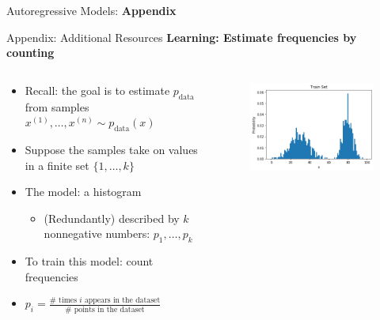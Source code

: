 \begin{frame}[allowframebreaks]{}
    \centering
    \LARGE Autoregressive Models: \textbf{Appendix}
\end{frame}

\begin{frame}[allowframebreaks]{Appendix: Additional Resources}
\large
\textbf{Learning: Estimate frequencies by counting}
\normalsize
\begin{columns}
    \begin{column}{0.55\textwidth}
       \begin{itemize}
            \setlength{\itemsep}{0.75em}
            \item Recall: the goal is to estimate $p_{\text{data}}$ from samples $x^{(1)}, \ldots, x^{(n)} \sim p_{\text{data}}(x)$
            \item Suppose the samples take on values in a finite set $\{1, \ldots, k\}$
            \item The model: a histogram
            \begin{itemize}
                \item (Redundantly) described by $k$ nonnegative numbers: $p_1, \ldots, p_k$
            \end{itemize}
            \item To train this model: count frequencies
            \item $p_i = \frac{\# \text{ times } i \text{ appears in the dataset}}{\# \text{ points in the dataset}}$
        \end{itemize}
    \end{column}
    \begin{column}{0.45\textwidth}
        \begin{figure}
            \centering
            \includegraphics[width=1.1\textwidth,keepaspectratio]{images/autoregressive/histogram_training.png}
        \end{figure}
    \end{column}
\end{columns}


\end{frame}
